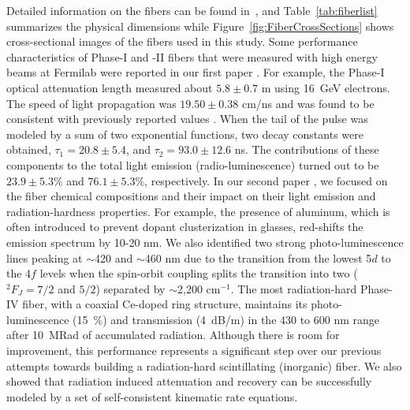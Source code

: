 \documentclass[a4paper,11pt]{article}
\begin{document}
Detailed information on the fibers can be found in~\cite{JINSTPaper}, and Table~\ref{tab:fiberlist} summarizes the physical dimensions while Figure~\ref{fig:FiberCrossSections} shows cross-sectional images of the fibers used in this study.  Some performance characteristics of Phase-I and -II fibers that were measured with high energy beams at Fermilab were reported in our first paper \cite{JINSTPaper}.  For example, the Phase-I optical attenuation length measured about $5.8\pm0.7$ m using 16~GeV  electrons.  The speed of light propagation was $19.50\pm0.38$ cm/ns and was found to be consistent with previously reported values \cite{Goro,Akch97}.  When the tail of the pulse was modeled by a sum of two exponential functions, two decay constants were obtained, $\tau_1= 20.8\pm5.4$, and $\tau_2= 93.0\pm12.6$ ns.  The contributions of these components to the total light emission (radio-luminescence) turned out to be $23.9\pm5.3$\% and $76.1\pm5.3$\%, respectively.  In our second paper \cite{JINSTPaper2}, we focused on the fiber chemical compositions and their impact on their light emission and radiation-hardness properties.  For example, the presence of aluminum, which is often introduced to prevent dopant clusterization in glasses, red-shifts the emission spectrum by 10-20 nm.  We also identified two strong photo-luminescence lines peaking at $\sim$420 and $\sim$460 nm due to the transition from the lowest 5$d$ to the 4$f$ levels when the spin-orbit coupling splits the transition into two ($^2F_{J}=7/2$ and $5/2$) separated by $\sim$2,200 cm$^{-1}$. The most radiation-hard Phase-IV fiber, with a coaxial Ce-doped ring structure, maintains its photo-luminescence (15~\%) and transmission (4~dB/m) in the 430 to 600 nm range after 10~MRad of accumulated radiation. Although there is room for improvement, this performance represents a significant step over our previous attempts towards building a radiation-hard scintillating (inorganic) fiber.  We also showed that radiation induced attenuation and recovery can be successfully modeled by a set of self-consistent kinematic rate equations.
\end{document}
